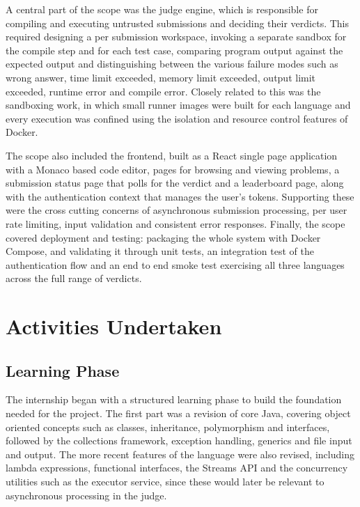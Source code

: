 \documentclass[12pt,a4paper]{report}
\begin{document}
A central part of the scope was the judge engine, which is responsible for compiling and executing untrusted submissions and deciding their verdicts. This required designing a per submission workspace, invoking a separate sandbox for the compile step and for each test case, comparing program output against the expected output and distinguishing between the various failure modes such as wrong answer, time limit exceeded, memory limit exceeded, output limit exceeded, runtime error and compile error. Closely related to this was the sandboxing work, in which small runner images were built for each language and every execution was confined using the isolation and resource control features of Docker.

The scope also included the frontend, built as a React single page application with a Monaco based code editor, pages for browsing and viewing problems, a submission status page that polls for the verdict and a leaderboard page, along with the authentication context that manages the user's tokens. Supporting these were the cross cutting concerns of asynchronous submission processing, per user rate limiting, input validation and consistent error responses. Finally, the scope covered deployment and testing: packaging the whole system with Docker Compose, and validating it through unit tests, an integration test of the authentication flow and an end to end smoke test exercising all three languages across the full range of verdicts.

\chapter*{Activities Undertaken}

\section*{Learning Phase}
The internship began with a structured learning phase to build the foundation needed for the project. The first part was a revision of core Java, covering object oriented concepts such as classes, inheritance, polymorphism and interfaces, followed by the collections framework, exception handling, generics and file input and output. The more recent features of the language were also revised, including lambda expressions, functional interfaces, the Streams API and the concurrency utilities such as the executor service, since these would later be relevant to asynchronous processing in the judge.
\end{document}
